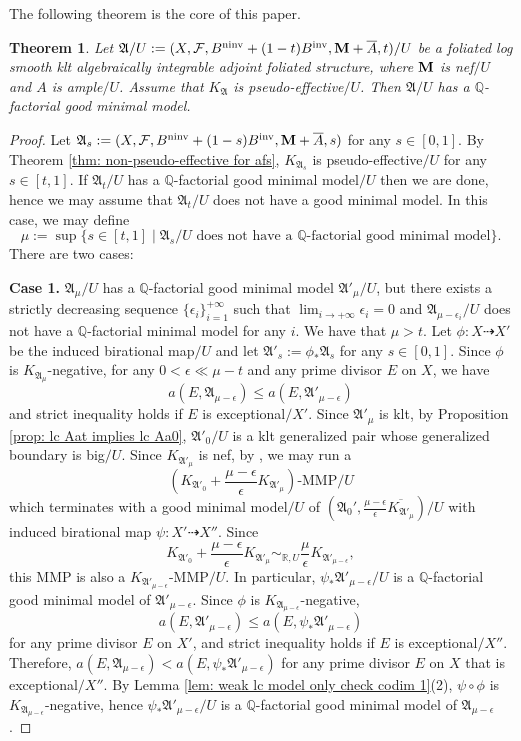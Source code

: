\documentclass[12pt]{amsart}
\numberwithin{equation}{section}
\newcommand{\Mm}{{\bf{M}}}
\newcommand{\ninv}{\operatorname{ninv}}
\newcommand{\inv}{\operatorname{inv}}
\newcommand{\Aa}{{\mathfrak{A}}}
\newcommand{\Ff}{\mathcal{F}}
\newtheorem{thm}{Theorem}[section]
\theoremstyle{definition}
\theoremstyle{definition}
\theoremstyle{definition}
\begin{document}
The following theorem is the core of this paper.

\begin{thm}\label{thm: log smooth existence of good minimal model}
    Let $\Aa/U:=(X,\Ff,B^{\ninv}+(1-t)B^{\inv},\Mm+\overline{A},t)/U$ be a foliated log smooth klt algebraically integrable adjoint foliated structure, where $\Mm$ is nef$/U$ and $A$ is ample$/U$. Assume that $K_{\Aa}$ is pseudo-effective$/U$. 
    Then $\Aa/U$ has a $\mathbb Q$-factorial good minimal model.
\end{thm}
\iffalse
\begin{proof}
Let $\Aa_s:=(X,\Ff,B^{\ninv}+(1-s)B^{\inv},\Mm+\overline{A},s)$ for any $s\in [0,1]$. By Theorem \ref{thm: non-pseudo-effective for afs}, $K_{\Aa_s}$ is pseudo-effective$/U$ for any $s\in [t,1]$. If $\Aa_t/U$ has a $\mathbb Q$-factorial good minimal model$/U$ then we are done, hence we may assume that $\Aa_t/U$ does not have a good minimal model. In this case, we may define
$$\mu:=\sup\{s\in [t,1]\mid \Aa_s/U\text{ does not have a }\mathbb Q\text{-factorial good minimal model}\}.$$
There are two cases:

\medskip

\noindent\textbf{Case 1.} $\Aa_\mu/U$ has a $\mathbb Q$-factorial good minimal model $\Aa'_{\mu}/U$, but there exists a strictly decreasing sequence $\{\epsilon_i\}_{i=1}^{+\infty}$ such that $\lim_{i\rightarrow+\infty}\epsilon_i=0$ and $\Aa_{\mu-\epsilon_i}/U$ does not have a $\mathbb Q$-factorial minimal model for any $i$. We have that $\mu>t$. 
Let $\phi\colon X\dashrightarrow X'$
be the induced birational map$/U$ and let $\Aa'_s:=\phi_*\Aa_s$ for any $s\in [0,1]$. Since $\phi$ is $K_{\Aa_{\mu}}$-negative, for any $0<\epsilon\ll\mu-t$ and any prime divisor $E$ on $X$, we have
$$a(E,\Aa_{\mu-\epsilon})\leq a(E,\Aa'_{\mu-\epsilon})$$
and strict inequality holds if $E$ is exceptional$/X'$.
Since $\Aa'_{\mu}$ is klt, by Proposition \ref{prop: lc Aat implies lc Aa0}, $\Aa'_0/U$ is a klt generalized pair whose generalized boundary is big$/U$. Since $K_{\Aa'_{\mu}}$ is nef, by \cite[Lemma 4.4]{BZ16}, we may run a
$$\left(K_{\Aa'_0}+\frac{\mu-\epsilon}{\epsilon}K_{\Aa'_{\mu}}\right)\text{-MMP}/U$$
which terminates with a good minimal model$/U$ of $(\Aa_0',\frac{\mu-\epsilon}{\epsilon}\overline{K_{\Aa'_{\mu}}})/U$ with induced birational map $\psi: X'\dashrightarrow X''$. Since
$$K_{\Aa'_0}+\frac{\mu-\epsilon}{\epsilon}K_{\Aa'_{\mu}}\sim_{\mathbb R,U}\frac{\mu}{\epsilon}K_{\Aa'_{\mu-\epsilon}},$$
this MMP is also a $K_{\Aa'_{\mu-\epsilon}}$-MMP$/U$. In particular, $\psi_*\Aa'_{\mu-\epsilon}/U$ is a $\mathbb Q$-factorial good minimal model of $\Aa'_{\mu-\epsilon}$. Since $\phi$ is $K_{\Aa_{\mu-\epsilon}}$-negative, 
$$a(E,\Aa'_{\mu-\epsilon})\leq a(E,\psi_*\Aa'_{\mu-\epsilon})$$
for any prime divisor $E$ on $X'$, and strict inequality holds if $E$ is exceptional$/X''$. Therefore, $a(E,\Aa_{\mu-\epsilon})<a(E,\psi_*\Aa'_{\mu-\epsilon})$ for any prime divisor $E$ on $X$ that is exceptional$/X''$. By Lemma \ref{lem: weak lc model only check codim 1}(2), $\psi\circ\phi$ is $K_{\Aa_{\mu-\epsilon}}$-negative, hence $\psi_*\Aa'_{\mu-\epsilon}/U$ is a $\mathbb Q$-factorial good minimal model of $\Aa_{\mu-\epsilon}$. 


\end{proof}
\end{document}
